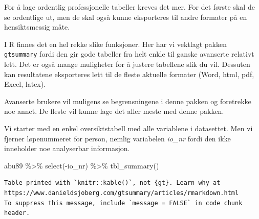 \documentclass[
  letterpaper,
  DIV=11,
  numbers=noendperiod]{scrreprt}
\newenvironment{Shaded}{\begin{snugshade}}{\end{snugshade}}
\newcommand{\FunctionTok}[1]{\textcolor[rgb]{0.28,0.35,0.67}{#1}}
\newcommand{\NormalTok}[1]{\textcolor[rgb]{0.00,0.23,0.31}{#1}}
\newcommand{\SpecialCharTok}[1]{\textcolor[rgb]{0.37,0.37,0.37}{#1}}
\theoremstyle{definition}
\theoremstyle{remark}
\begin{document}
For å lage ordentlig professjonelle tabeller kreves det mer. For det
første skal de se ordentlige ut, men de skal også kunne eksporteres til
andre formater på en hensiktsmessig måte.

I R finnes det en hel rekke slike funksjoner. Her har vi vektlagt pakken
\texttt{gtsummary} fordi den gir gode tabeller fra helt enkle til ganske
avanserte relativt lett. Det er også mange muligheter for å justere
tabellene slik du vil. Dessuten kan resultatene eksporteres lett til de
fleste aktuelle formater (Word, html, pdf, Excel, latex).

Avanserte brukere vil muligens se begrensningene i denne pakken og
foretrekke noe annet. De fleste vil kunne lage det aller meste med denne
pakken.

Vi starter med en enkel oversiktstabell med alle variablene i
datasettet. Men vi fjerner løpenummeret for person, nemlig variabelen
\emph{io\_nr} fordi den ikke inneholder noe analyserbar informasjon.

\begin{Shaded}
\begin{Highlighting}[]
\NormalTok{abu89 }\SpecialCharTok{\%\textgreater{}\%} 
  \FunctionTok{select}\NormalTok{(}\SpecialCharTok{{-}}\NormalTok{io\_nr) }\SpecialCharTok{\%\textgreater{}\%} 
  \FunctionTok{tbl\_summary}\NormalTok{()}
\end{Highlighting}
\end{Shaded}

\begin{verbatim}
Table printed with `knitr::kable()`, not {gt}. Learn why at
https://www.danieldsjoberg.com/gtsummary/articles/rmarkdown.html
To suppress this message, include `message = FALSE` in code chunk header.
\end{verbatim}
\end{document}
